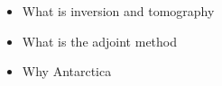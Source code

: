 \begin{itemize}
\item What is inversion and tomography 
\item What is the adjoint method
\item Why Antarctica
\end{itemize}

